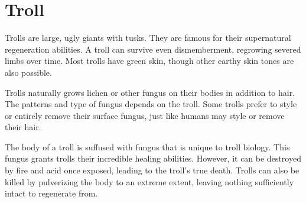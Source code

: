 

\section{Troll}
  Trolls are large, ugly giants with tusks.
  They are famous for their supernatural regeneration abilities.
  A troll can survive even dismemberment, regrowing severed limbs over time.
  Most trolls have green skin, though other earthy skin tones are also possible.

  Trolls naturally grows lichen or other fungus on their bodies in addition to hair.
  The patterns and type of fungus depends on the troll.
  Some trolls prefer to style or entirely remove their surface fungus, just like humans may style or remove their hair.

  The body of a troll is suffused with fungus that is unique to troll biology.
  This fungus grants trolls their incredible healing abilities.
  However, it can be destroyed by fire and acid once exposed, leading to the troll's true death.
  Trolls can also be killed by pulverizing the body to an extreme extent, leaving nothing sufficiently intact to regenerate from.

